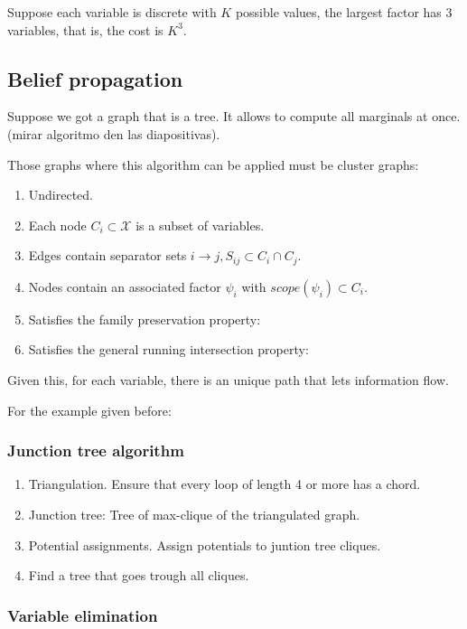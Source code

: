 \documentclass[11pt]{article}
\theoremstyle{definition}
\begin{document}
Suppose each variable is discrete with \( K \) possible values, the largest factor has \( 3 \) variables, that is, the cost is \( K^{3} \).

\subsection{Belief propagation}

Suppose we got a graph that is a tree. It allows to compute all marginals at once.
(mirar algoritmo den las diapositivas).

Those graphs where this algorithm can be applied must be cluster graphs:
\begin{enumerate}
  \item Undirected.
  \item Each node \( C_{i} \subset \mathcal{X} \) is a subset of variables.
  \item Edges contain separator sets \( i \to j, S_{ij} \subset C_{i} \cap C_{j} \).
  \item Nodes contain an associated factor \( \psi_{i} \) with \( scope(\psi_{i}) \subset C_{i} \).
  \item Satisfies the family preservation property:
  \item Satisfies the general running intersection property:
\end{enumerate}
Given this, for each variable, there is an unique path that lets information flow.

For the example given before:

\subsubsection{Junction tree algorithm}

\begin{enumerate}
  \item Triangulation. Ensure that every loop of length 4 or more has a chord.
  \item Junction tree: Tree of max-clique of the triangulated graph.
  \item Potential assignments. Assign potentials to juntion tree cliques.
 \item Find a tree that goes trough all cliques.
\end{enumerate}

\subsubsection{Variable elimination}
\end{document}
